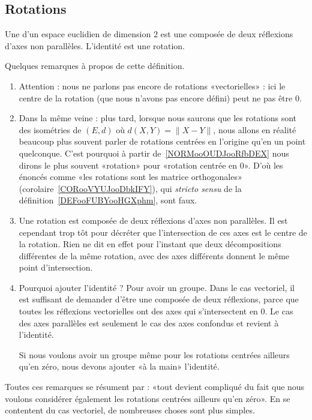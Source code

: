 \subsection{Rotations}

\begin{definition}        \label{DEFooFUBYooHGXphm}
	Une  d'un espace euclidien de dimension \( 2\) est une composée de deux réflexions d'axes non parallèles. L'identité est une rotation.
\end{definition}

\begin{normaltext}
	Quelques remarques à propos de cette définition.
	\begin{enumerate}
		\item
		      Attention : nous ne parlons pas encore de rotations «vectorielles» : ici le centre de la rotation (que nous n'avons pas encore défini) peut ne pas être \( 0\).
		\item
		      Dans la même veine : plus tard, lorsque nous saurons que les rotations sont des isométries de \( (E,d)\) où \( d(X,Y)=\| X-Y \|\), nous allons en réalité beaucoup plus souvent parler de rotations centrées en l'origine qu'en un point quelconque. C'est pourquoi à partir de~\ref{NORMooOUDJooRfbDEX} nous dirons le plus souvent «rotation»  pour «rotation centrée en \( 0\)». D'où les énoncés comme «les rotations sont les matrice orthogonales» (corolaire~\ref{CORooVYUJooDbkIFY}), qui \emph{stricto sensu} de la définition~\ref{DEFooFUBYooHGXphm}, sont faux.
		\item
		      Une rotation est composée de deux réflexions d'axes non parallèles. Il est cependant trop tôt pour décréter que l'intersection de ces axes est le centre de la rotation. Rien ne dit en effet pour l'instant que deux décompositions différentes de la même rotation, avec des axes différents donnent le même point d'intersection.
		\item
		      Pourquoi ajouter l'identité  ? Pour avoir un groupe. Dans le cas vectoriel, il est suffisant de demander d'être une composée de deux réflexions, parce que toutes les réflexions vectorielles ont des axes qui s'intersectent en \( 0\). Le cas des axes parallèles est seulement le cas des axes confondus et revient à l'identité.

		      Si nous voulons avoir un groupe même pour les rotations centrées ailleurs qu'en zéro, nous devons ajouter «à la main» l'identité.
	\end{enumerate}

	Toutes ces remarques se résument par : «tout devient compliqué du fait que nous voulons considérer également les rotations centrées ailleurs qu'en zéro». En se contentent du cas vectoriel, de nombreuses choses sont plus simples.
\end{normaltext}


